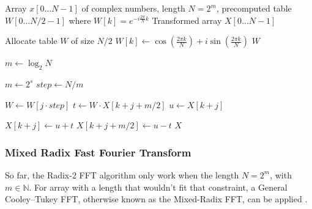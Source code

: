 \documentclass{article}
\begin{document}
\begin{algorithm}[H]
\caption{Iterative Radix-2 IFFT with Precomputed Twiddle Table}
\begin{algorithmic}[1]
\Require Array $x[0 \dots N-1]$ of complex numbers, length $N = 2^m$, precomputed table $W[0 \dots N/2 - 1]$ where $W[k] = e^{-i \frac{2\pi}{N} k}$
\Ensure Transformed array $X[0 \dots N-1]$

    \State Allocate table $W$ of size $N/2$
        \State $W[k] \gets \cos\left(\frac{2\pi k}{N}\right) + i \sin\left(\frac{2\pi k}{N}\right)$
    \EndFor
    \State \Return $W$
\EndProcedure

\Statex

\State $m \gets \log_2N$
    \State {}
    
     
        \State $m \gets 2^s$ 
        \State $step \gets N / m$ 
        
         
             
                \State $W \gets W[j \cdot step]$ 
                \State $t \gets W \cdot X[k + j + m/2]$
                \State $u \gets X[k + j]$
                
                \State $X[k + j] \gets u + t$
                \State $X[k + j + m/2] \gets u - t$
            \EndFor
        \EndFor
    \EndFor
    \State \Return $X$
\EndProcedure
\end{algorithmic}
\end{algorithm}

\subsubsection{Mixed Radix Fast Fourier Transform}
So far, the Radix-2 FFT algorithm only work when the length $N=2^m$, with $m \in \mathbb{N}$. For array with a length that wouldn't fit that constraint, a General Cooley--Tukey FFT, otherwise known as the Mixed-Radix FFT, can be applied \cite{d3ea2d52-5ab2-3128-8b80-efb85267295d}. 
\end{document}
